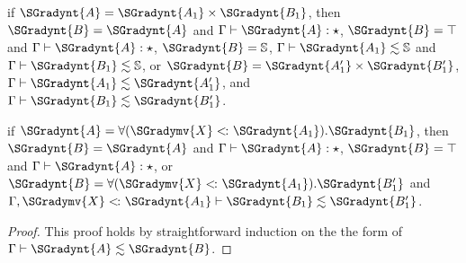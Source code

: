 \begin{lemma}
\begin{enumR}
  \item if $\SGradynt{A} =  \SGradynt{A_{{\mathrm{1}}}}  \times  \SGradynt{B_{{\mathrm{1}}}} $, then
    $\SGradynt{B} = \SGradynt{A}$ and $ \Gamma  \vdash  \SGradynt{A}  : \star $, $\SGradynt{B} =  \top $ and $ \Gamma  \vdash  \SGradynt{A}  : \star $, $\SGradynt{B} =  \mathbb{S} $, $ \Gamma  \vdash  \SGradynt{A_{{\mathrm{1}}}}  \lesssim   \mathbb{S}  $ and
    $ \Gamma  \vdash  \SGradynt{B_{{\mathrm{1}}}}  \lesssim   \mathbb{S}  $, or $\SGradynt{B} =  \SGradynt{A'_{{\mathrm{1}}}}  \times  \SGradynt{B'_{{\mathrm{1}}}} $, $ \Gamma  \vdash  \SGradynt{A_{{\mathrm{1}}}}  \lesssim  \SGradynt{A'_{{\mathrm{1}}}} $, and $ \Gamma  \vdash  \SGradynt{B_{{\mathrm{1}}}}  \lesssim  \SGradynt{B'_{{\mathrm{1}}}} $.
  \item if $\SGradynt{A} =  \forall ( \SGradymv{X}  <\hspace{-2px}\colon  \SGradynt{A_{{\mathrm{1}}}} ).  \SGradynt{B_{{\mathrm{1}}}} $, then
    $\SGradynt{B} = \SGradynt{A}$ and $ \Gamma  \vdash  \SGradynt{A}  : \star $, $\SGradynt{B} =  \top $ and $ \Gamma  \vdash  \SGradynt{A}  : \star $,
    or $\SGradynt{B} =  \forall ( \SGradymv{X}  <\hspace{-2px}\colon  \SGradynt{A_{{\mathrm{1}}}} ).  \SGradynt{B'_{{\mathrm{1}}}} $ and $  \Gamma , \SGradymv{X}  <\hspace{-2px}\colon  \SGradynt{A_{{\mathrm{1}}}}   \vdash  \SGradynt{B_{{\mathrm{1}}}}  \lesssim  \SGradynt{B'_{{\mathrm{1}}}} $.
  \end{enumR}
\end{lemma}
\begin{proof}
  This proof holds by straightforward induction on the the form of $ \Gamma  \vdash  \SGradynt{A}  \lesssim  \SGradynt{B} $.
\end{proof}

